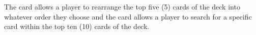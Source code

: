 The \Sort card allows a player to rearrange the top five (5) cards of the deck into whatever order they choose and the \Ser card allows a player to search for a specific card within the top ten (10) cards of the deck.

\begin{comment}

\paragraph{\Sortns:}
Sorting is the arrangement of items into an ordered sequence. In \pwTwoNS, the \Sort card allows a player to rearrange the top five (5) cards of the deck into whatever order they choose. This allows a player to control what cards players will draw for the next five turns, three cards for the player, and two for their opponent. When the card is played, an overlay is opened showing the top five cards and the player can drag and drop cards to reorder them.

\paragraph{\Serns:}
Searching is the process of locating a particular element in a given set of elements. In \pwTwoNS, the \Ser card allows a player to search for a specific card within the top ten (10) cards of the deck. Playing the card results in an overlay being opened that shows these cards and the player selects one to immediately put into their hand for their next turn.

\end{comment}